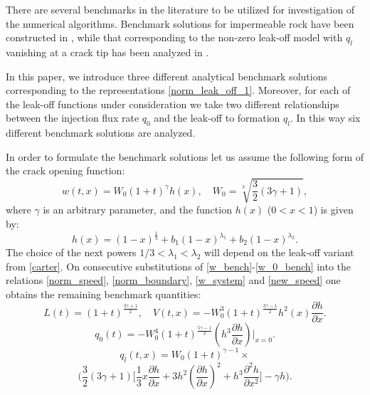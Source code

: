 

There are several benchmarks in the literature to be utilized for investigation of the numerical algorithms.
Benchmark solutions for impermeable rock have been constructed in \cite{Kemp,Linkov_4},
while that corresponding to the non-zero leak-off model with  $q_l$ vanishing at a crack tip has been
analyzed in \cite{MWL}.




In this paper, we introduce three different analytical benchmark
solutions cor\-res\-pond\-ing to the representations
\eqref{norm_leak_off_1}. Moreover, for each of the leak-off
functions under consideration we take two different
relationships between the injection flux rate $q_0$ and the leak-off
to formation $q_l$. In this way
 six different benchmark solutions are analyzed.

In order to formulate the benchmark solutions let us assume the
following form of the crack opening function:
\begin{equation}\label{w_bench}
w(t,x)=W_0(1+t)^\gamma h(x),\quad W_0=\sqrt[3]{\frac{3}{2}(3\gamma+1)},
\end{equation}
where $\gamma$ is an arbitrary parameter, and the function $h(x)$ ($0<x<1$) is given by:
\begin{equation}\label{w_0_bench}
h(x)=(1- x)^\frac{1}{3}+b_1(1-x)^{\lambda_1}+b_2(1-x)^{\lambda_2}.
\end{equation}
The choice of the next powers $1/3<\lambda_1<\lambda_2$ will depend on the
leak-off variant from \eqref{carter}. On consecutive
substitutions of \eqref{w_bench}-\eqref{w_0_bench} into the
relations \eqref{norm_speed}, \eqref{norm_boundary},
\eqref{w_system} and \eqref{new_speed} one obtains the remaining
benchmark quantities:
\begin{equation}\label{v_bench}
L(t)=(1+t)^{\frac{3\gamma+1}{2}},\quad V(t,x)=-W_0^3(1+t)^{\frac{3\gamma-1}{2}}h^2(x)\frac{\partial h}{\partial x}.
\end{equation}
\begin{equation}\label{q_0_bench}
q_0(t)=-W_0^4(1+t)^{\frac{5\gamma-1}{2}}\left(h^3\frac{\partial h}{\partial x}\right)|_{x=0}.
\end{equation}
\begin{equation}
\label{q_l_bench}
q_l(t,x)=W_0(1+t)^{\gamma-1}\times
\end{equation}
\[
\Big(\frac{3}{2}(3\gamma+1)\Big[\frac{1}{3}x\frac{\partial
h}{\partial x} +3h^2\left(\frac{\partial h}{\partial x}\right)^2
+h^3\frac{\partial^2 h}{\partial x^2}\Big]-\gamma h\Big).
\]



